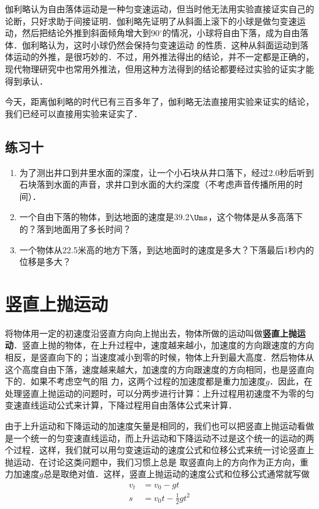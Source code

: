 伽利略认为自由落体运动是一种匀变速运动，但当时他无法用实验直接证实自己的论断，只好求助于间接证明．伽利略先证明了从斜面上滚下的小球是做匀变速运动，然后把结论外推到斜面倾角增大到90$^\circ$的情况，小球将自由下落，成为自由落体．伽利略认为，这时小球仍然会保持匀变速运动
的性质．这种从斜面运动到落体运动的外推，是很巧妙的．不过，用外推法得出的结论，并不一定都是正确的，现代物理研究中也常用外推法，但用这种方法得到的结论都要经过实验的证实才能得到承认．

今天，距离伽利略的时代已有三百多年了，伽利略无法直接用实验来证实的结论，我们已经可以直接用实验来证实了．


\subsection*{练习十}
\begin{enumerate}
	\item 为了测出井口到井里水面的深度，让一个小石块从井口落下，经过2.0秒后听到石块落到水面的声音，求井口到水面的大约深度（不考虑声音传播所用的时间）．
\item 一个自由下落的物体，到达地面的速度是39.2$\Ums$，这个物体是从多高落下的？落到地面用了多长时间？
\item 一个物体从22.5米高的地方下落，到达地面时的速度是多大？下落最后1秒内的位移是多大？
\end{enumerate}


\section{竖直上抛运动}
将物体用一定的初速度沿竖直方向向上抛出去，物体所做的运动叫做\textbf{竖直上抛运动}．竖直上抛的物体，在上升过程中，速度越来越小，加速度的方向跟速度的方向相反，是竖直向下的；当速度减小到零的时候，物体上升到最大高度．然后物体从这个高度自由下落，速度越来越大，加速度的方向跟速度的方向相同，也是竖直向下的．如果不考虑空气的阻
力，这两个过程的加速度都是重力加速度$g$．因此，在处理竖直上抛运动的问题时，可以分两步进行计算：上升过程用初速度不为零的匀变速直线运动公式来计算，下降过程用自由落体公式来计算．

由于上升运动和下降运动的加速度矢量是相同的，我们也可以把竖直上抛运动看做是一个统一的匀变速直线运动，而上升运动和下降运动不过是这个统一的运动的两个过程．这样，我们就可以用匀变速运动的速度公式和位移公式来统一讨论竖直上抛运动．在讨论这类问题中，我们习惯上总是
取竖直向上的方向作为正方向，重力加速度$g$总是取绝对值．这样，竖直上抛运动的速度公式和位移公式通常就写做
\[\begin{split}
v_t&=v_0-gt\\
s&=v_0 t-\frac{1}{2}gt^2
\end{split}\]

